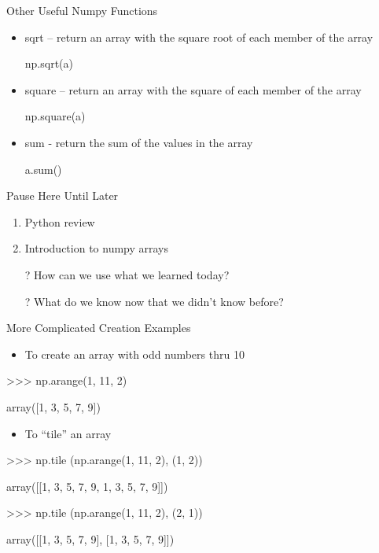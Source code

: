 \documentclass[aspectratio=169]{beamer}
\begin{document}
\begin{frame}[fragile]{Other Useful Numpy Functions}

\begin{itemize}
\item sqrt -- return an array with the square root of each member of the array
\begin{SQL}
np.sqrt(a)
\end{SQL}
\item square -- return an array with the square of each member of the array
\begin{SQL}
np.square(a)
\end{SQL}
\item sum - return the sum of the values in the array
\begin{SQL}
a.sum()
\end{SQL}
\end{itemize}
\end{frame}


\begin{frame}{Pause Here Until Later}
\begin{enumerate}
\item Python review
\item Introduction to numpy arrays
\end{enumerate}

\begin{itemize}
	\item[?] How can we use what we learned today?
	\vspace{2em}
	\item[?] What do we know now that we didn't know before?
\end{itemize}
\end{frame}


\begin{frame}[fragile]{More Complicated Creation Examples}

\begin{itemize}
\item To create an array with odd numbers thru 10
\end{itemize}
\begin{SQL}
>>> np.arange(1, 11, 2)

array([1, 3, 5, 7, 9])
\end{SQL}

\begin{itemize}
\item To ``tile'' an array 
\end{itemize}
\begin{SQL}
>>> np.tile (np.arange(1, 11, 2), (1, 2))

array([[1, 3, 5, 7, 9, 1, 3, 5, 7, 9]])

>>> np.tile (np.arange(1, 11, 2), (2, 1))

array([[1, 3, 5, 7, 9],
       [1, 3, 5, 7, 9]])
\end{SQL}
\end{frame}
\end{document}
